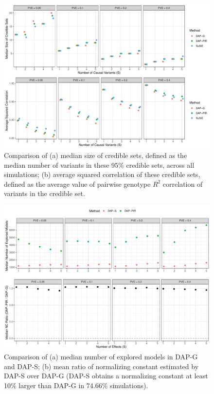 \documentclass[pdflatex,sn-mathphys-num]{sn-jnl}%
\theoremstyle{thmstyleone}%
\theoremstyle{thmstyletwo}%
\theoremstyle{thmstylethree}%
\begin{document}
\begin{figure}[H]
    \centering
    \includegraphics[width=1\textwidth]{files/plot_size.pdf}
    \caption{Comparison of (a) median size of credible sets, defined as the median number of variants in these 95\% credible sets, across all simulations; (b) average squared correlation of these credible sets, defined as the average value of pairwise genotype $R^2$ correlation of variants in the credible set.}
    \label{fig:size}
\end{figure}



\begin{figure}[H]
    \centering
    \includegraphics[width=1\textwidth]{files/plot_ratio.pdf}
    \caption{Comparison of (a) median number of explored models in DAP-G and DAP-S; (b) mean ratio of normalizing constant estimated by DAP-S over DAP-G (DAP-S obtains a normalizing constant at least 10\% larger than DAP-G in 74.66\% simulations).}
    \label{fig:ratio}
\end{figure}
\end{document}
